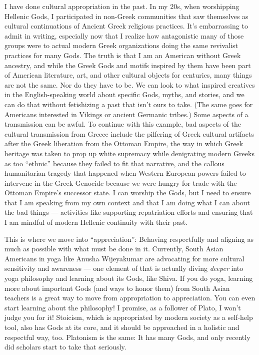 \documentclass[
]{book}
\begin{document}
I have done cultural appropriation in the past. In my 20s, when worshipping Hellenic Gods, I participated in non-Greek communities that saw themselves as cultural continuations of Ancient Greek religious practices. It's embarrassing to admit in writing, especially now that I realize how antagonistic many of those groups were to actual modern Greek organizations doing the same revivalist practices for many Gods. The truth is that I am an American without Greek ancestry, and while the Greek Gods and motifs inspired by them have been part of American literature, art, and other cultural objects for centuries, many things are not the same. Nor do they have to be. We can look to what inspired creatives in the English-speaking world about specific Gods, myths, and stories, and we can do that without fetishizing a past that isn't ours to take. (The same goes for Americans interested in Vikings or ancient Germanic tribes.) Some aspects of a transmission can be awful. To continue with this example, bad aspects of the cultural transmission from Greece include the pilfering of Greek cultural artifacts after the Greek liberation from the Ottoman Empire, the way in which Greek heritage was taken to prop up white supremacy while denigrating modern Greeks as too ``ethnic'' because they failed to fit that narrative, and the callous humanitarian tragedy that happened when Western European powers failed to intervene in the Greek Genocide because we were hungry for trade with the Ottoman Empire's successor state. I can worship the Gods, but I need to ensure that I am speaking from my own context and that I am doing what I can about the bad things --- activities like supporting repatriation efforts and ensuring that I am mindful of modern Hellenic continuity with their past.

This is where we move into ``appreciation'': Behaving respectfully and aligning as much as possible with what must be done in it. Currently, South Asian Americans in yoga like Anusha Wijeyakumar are advocating for more cultural sensitivity and awareness --- one element of that is actually diving \emph{deeper} into yoga philosophy and learning about its Gods, like Shiva. If you do yoga, learning more about important Gods (and ways to honor them) from South Asian teachers is a great way to move from appropriation to appreciation. You can even start learning about the philosophy! I promise, as a follower of Plato, I won't judge you for it! Stoicism, which is appropriated by modern society as a self-help tool, also has Gods at its core, and it should be approached in a holistic and respectful way, too. Platonism is the same: It has many Gods, and only recently did scholars start to take that seriously.
\end{document}
